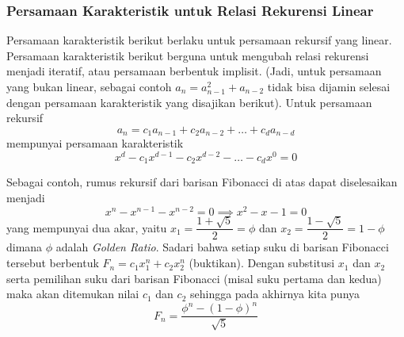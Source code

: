 \subsubsection{Persamaan Karakteristik untuk Relasi Rekurensi Linear}
Persamaan karakteristik berikut berlaku untuk persamaan rekursif yang linear. Persamaan karakteristik berikut berguna untuk mengubah relasi rekurensi menjadi iteratif, atau persamaan berbentuk implisit. (Jadi, untuk persamaan yang bukan linear, sebagai contoh $a_n = a_{n-1}^2 + a_{n-2}$ tidak bisa dijamin selesai dengan persamaan karakteristik yang disajikan berikut).
Untuk persamaan rekursif
$$a_n = c_1a_{n-1}+c_2a_{n-2}+\dots+c_da_{n-d}$$
mempunyai persamaan karakteristik
$$x^d-c_1x^{d-1}-c_2x^{d-2}-\dots-c_dx^0=0$$

Sebagai contoh, rumus rekursif dari barisan Fibonacci di atas dapat diselesaikan menjadi 
$$x^{n}-x^{n-1}-x^{n-2}=0 \implies x^2-x-1=0$$
yang mempunyai dua akar, yaitu $x_1 = \dfrac{1+\sqrt{5}}{2}=\phi$ dan $x_2 = \dfrac{1-\sqrt{5}}{2}=1-\phi$ dimana $\phi$ adalah \textit{Golden Ratio}. Sadari bahwa setiap suku di barisan Fibonacci tersebut berbentuk $F_n = c_1x_1^n + c_2x_2^n$ (buktikan). Dengan substitusi $x_1$ dan $x_2$ serta pemilihan suku dari barisan Fibonacci (misal suku pertama dan kedua) maka akan ditemukan nilai $c_1$ dan $c_2$ sehingga pada akhirnya kita punya
$$F_n=\dfrac{\phi^n-(1-\phi)^n}{\sqrt{5}}$$